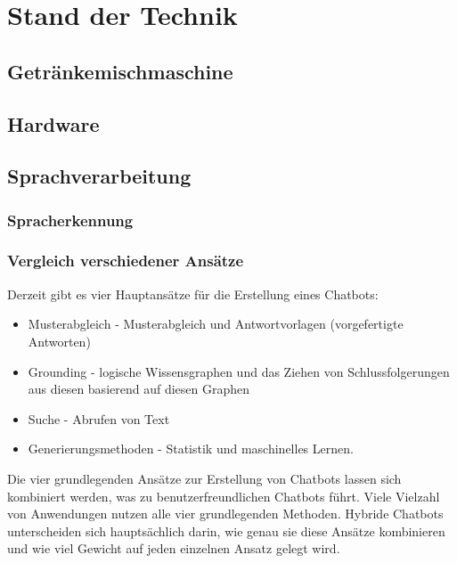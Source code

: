\chapter{Stand der Technik}
\section{Getränkemischmaschine}
\section{Hardware}
\section{Sprachverarbeitung}
\subsection{Spracherkennung}
\subsection{Vergleich verschiedener Ansätze}
Derzeit gibt es vier Hauptansätze für die Erstellung eines Chatbots:
\begin{itemize}
    \item Musterabgleich - Musterabgleich und Antwortvorlagen (vorgefertigte Antworten)
    \item Grounding - logische Wissensgraphen und das Ziehen von Schlussfolgerungen aus diesen basierend auf diesen Graphen
    \item Suche - Abrufen von Text
    \item Generierungsmethoden - Statistik und maschinelles Lernen.
\end{itemize}
Die vier grundlegenden Ansätze zur Erstellung von Chatbots lassen sich kombiniert werden, was zu benutzerfreundlichen Chatbots führt. Viele Vielzahl von Anwendungen nutzen alle vier grundlegenden Methoden. Hybride Chatbots unterscheiden sich hauptsächlich darin, wie genau sie diese Ansätze kombinieren und wie viel Gewicht auf jeden einzelnen Ansatz gelegt wird.
